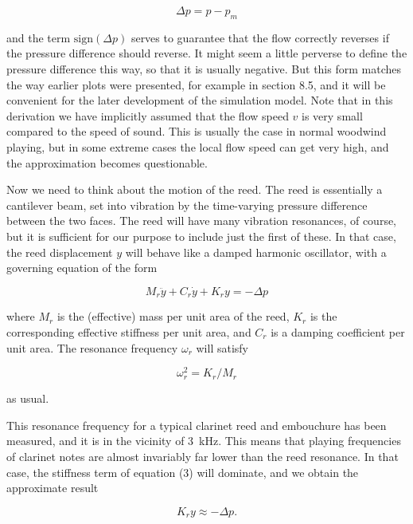   \begin{equation*}\Delta p = p-p_m \tag{2}\end{equation*} 

  \noindent{}and the term $\mathrm{sign}(\Delta p)$ serves to guarantee that 
  the flow correctly reverses if the pressure difference should reverse. It 
  might seem a little perverse to define the pressure difference this way, so 
  that it is usually negative. But this form matches the way earlier plots were 
  presented, for example in section 8.5, and it will be convenient for the 
  later development of the simulation model. Note that in this derivation we 
  have implicitly assumed that the flow speed $v$ is very small compared to the 
  speed of sound. This is usually the case in normal woodwind playing, but in 
  some extreme cases the local flow speed can get very high, and the 
  approximation becomes questionable. 

  Now we need to think about the motion of the reed. The reed is essentially a 
  cantilever beam, set into vibration by the time-varying pressure difference 
  between the two faces. The reed will have many vibration resonances, of 
  course, but it is sufficient for our purpose to include just the first of 
  these. In that case, the reed displacement $y$ will behave like a damped 
  harmonic oscillator, with a governing equation of the form 

  \begin{equation*}M_r \ddot{y} + C_r \dot{y} + K_r y=-\Delta p 
  \tag{3}\end{equation*} 

  \noindent{}where $M_r$ is the (effective) mass per unit area of the reed, 
  $K_r$ is the corresponding effective stiffness per unit area, and $C_r$ is a 
  damping coefficient per unit area. The resonance frequency $\omega_r$ will 
  satisfy 

  \begin{equation*}\omega_r^2=K_r/M_r \tag{4}\end{equation*} 

  \noindent{}as usual. 

  This resonance frequency for a typical clarinet reed and embouchure has been 
  measured, and it is in the vicinity of 3~kHz. This means that playing 
  frequencies of clarinet notes are almost invariably far lower than the reed 
  resonance. In that case, the stiffness term of equation (3) will dominate, 
  and we obtain the approximate result 

  \begin{equation*}K_r y \approx -\Delta p . \tag{5}\end{equation*} 

